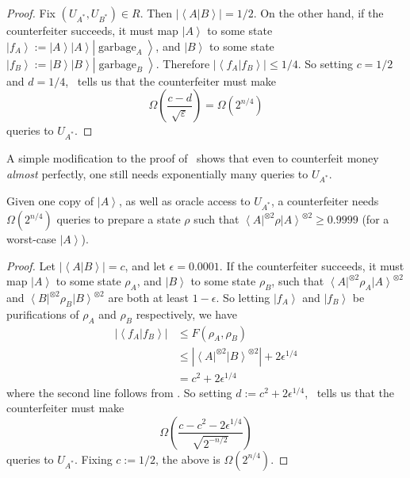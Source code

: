 \begin{proof}
Fix $\left(  U_{A^{\ast}},U_{B^{\ast}}\right)  \in R$. Then $\left\vert
\left\langle A|B\right\rangle \right\vert =1/2$. On the other hand, if the
counterfeiter succeeds, it must map $\left\vert A\right\rangle $ to some
state $\left\vert f_{A}\right\rangle :=\left\vert A\right\rangle \left\vert
A\right\rangle \left\vert \operatorname{garbage}_{A}\right\rangle $, and
$\left\vert B\right\rangle $ to some state $\left\vert f_{B}\right\rangle
:=\left\vert B\right\rangle \left\vert B\right\rangle \left\vert
\operatorname{garbage}_{B}\right\rangle $. Therefore $\left\vert
\left\langle f_{A}|f_{B}\right\rangle \right\vert \leq1/4$. So setting
$c=1/2$ and $d=1/4$, \ tells us that the counterfeiter
must make%
\[
\Omega\left(  \frac{c-d}{\sqrt{\varepsilon}}\right)  =\Omega\left(
2^{n/4}\right)
\]
queries to $U_{A^{\ast}}$.
\end{proof}

A simple modification to the proof of \ shows that even
to counterfeit money \emph{almost} perfectly, one still needs exponentially
many queries to $U_{A^{\ast}}$.

\begin{corollary}
\label{smallerrror}Given one copy
of $\left\vert A\right\rangle $, as well as oracle access to $U_{A^{\ast}}$, a
counterfeiter needs $\Omega(  2^{n/4})  $ queries to prepare a
state $\rho$ such that $\left\langle A\right\vert ^{\otimes2}\rho\left\vert
A\right\rangle ^{\otimes2}\geq0.9999$ (for a worst-case $\left\vert
A\right\rangle $).
\end{corollary}

\begin{proof}
Let $\left\vert \left\langle A|B\right\rangle \right\vert =c$, and let
$\epsilon=0.0001$. If the counterfeiter succeeds, it must map $\left\vert
A\right\rangle $ to some state $\rho_{A}$, and $\left\vert B\right\rangle
$ to some state $\rho_{B}$, such that $\left\langle A\right\vert ^{\otimes
2}\rho_{A}\left\vert A\right\rangle ^{\otimes2}$ and $\left\langle
B\right\vert ^{\otimes2}\rho_{B}\left\vert B\right\rangle ^{\otimes2}$ are
both at least $1-\epsilon$. So letting $\left\vert f_{A}\right\rangle $ and
$\left\vert f_{B}\right\rangle $ be purifications of $\rho_{A}$ and
$\rho_{B}$ respectively, we have%
\begin{align*}
\left\vert \left\langle f_{A}|f_{B}\right\rangle \right\vert  &  \leq F\left(
\rho_{A},\rho_{B}\right)  \\
&  \leq\left\vert \left\langle A\right\vert ^{\otimes2}\left\vert
B\right\rangle ^{\otimes2}\right\vert +2\epsilon^{1/4}\\
&  =c^{2}+2\epsilon^{1/4}%
\end{align*}
where the second line follows from . So setting
$d:=c^{2}+2\epsilon^{1/4}$, \ tells us that the
counterfeiter must make%
\[
\Omega\left(  \frac{c-c^{2}-2\epsilon^{1/4}}{\sqrt{2^{-n/2}}}\right)
\]
queries to $U_{A^{\ast}}$. Fixing $c:=1/2$, the above is $\Omega\left(
2^{n/4}\right)  $.
\end{proof}

